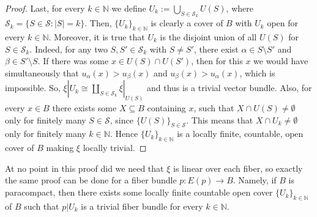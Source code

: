 \begin{proof}
Last, for every $k\in\mathbb{N}$ we define $U_k:=\bigcup_{S\in\mathcal{S}_k}U(S)$, where $\mathcal{S}_k=\{S\in\mathcal{S}:|S|=k\}$. Then, $\{U_k\}_{k\in\mathbb{N}}$ is clearly a cover of $B$ with $U_k$ open for every $k\in\mathbb{N}$. Moreover, it is true that $U_k$ is the disjoint union of all $U(S)$ for $S\in\mathcal{S}_k$. Indeed, for any two $S,S'\in\mathcal{S}_k$ with $S\neq S'$, there exist $\alpha\in S\setminus S'$ and $\beta\in S'\setminus S$. If there was some $x\in U(S)\cap U(S')$, then for this $x$ we would have simultaneously that $u_{\alpha}(x)>u_{\beta}(x)$ and $u_{\beta}(x)>u_{\alpha}(x)$, which is impossible. So, $\xi|U_k\cong\amalg_{S\in\mathcal{S}_k}\xi|_{U(S)}$ and thus is a trivial vector bundle. Also, for every $x\in B$ there exists some $X\subseteq B$ containing $x$, such that $X\cap U(S)\neq\emptyset$ only for finitely many $S\in\mathcal{S}$, since $\{U(S)\}_{S\in\mathcal{S}}$. This means that $X\cap U_k\neq\emptyset$ only for finitely many $k\in\mathbb{N}$. Hence $\{U_k\}_{k\in\mathbb{N}}$ is a locally finite, countable, open cover of $B$ making $\xi$ locally trivial.
\end{proof}
\begin{remark}\label{lem:paracompact_countable_cover_fb} At no point in this proof did we need that $\xi$ is linear over each fiber, so exactly the same proof can be done for a fiber bundle $p:E(p)\to B$. Namely, if $B$ is paracompact, then there exists some locally finite countable open cover $\{U_k\}_{k\in\mathbb{N}}$ of $B$ such that $p|U_k$ is a trivial fiber bundle for every $k\in\mathbb{N}$.
\end{remark}

